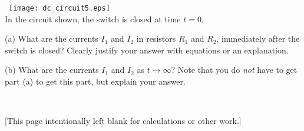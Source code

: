 \documentclass[12pt]{article}
\begin{document}
\noindent
~\hfill\texttt{[image: dc\_circuit5.eps]}\hfill~\\
In the circuit shown, the switch is closed at time $t=0$.

(a) What are the currents $I_1$ and $I_2$ in resistors $R_1$ and
$R_2$, immediately after the switch is closed?  Clearly justify your
answer with equations or an explanation.

\vfill

(b) What are the currents $I_1$ and $I_2$ as $t\rightarrow\infty$?
Note that you do \emph{not} have to get part (a) to get this part, but
explain your answer.

\vfill ~

\clearpage
\thispagestyle{empty}
[This page intentionally left blank for calculations or other work.]
\end{document}
